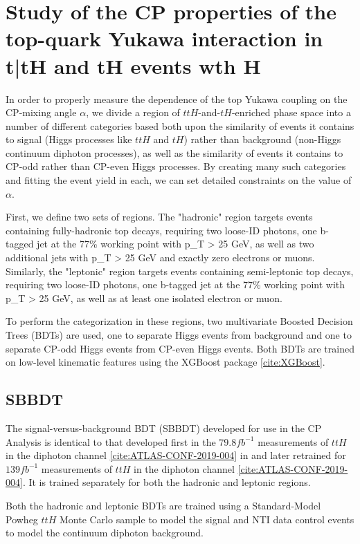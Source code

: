 \section{Study of the CP properties of the top-quark Yukawa interaction in t\bar{t}H and tH events wth H \rightarrow \gamma \gamma} \label{sec:ttHCPCategorization}

In order to properly measure the dependence of the top Yukawa coupling on the CP-mixing angle $\alpha$, we divide a region of $ttH$-and-$tH$-enriched phase space into a number of different categories based both upon the similarity of events it contains to signal (Higgs processes like $ttH$ and $tH$) rather than background (non-Higgs continuum diphoton processes), as well as the similarity of events it contains to CP-odd rather than CP-even Higgs processes. By creating many such categories and fitting the event yield in each, we can set detailed constraints on the value of $\alpha$.

First, we define two sets of regions. The "hadronic" region targets events containing fully-hadronic top decays, requiring two loose-ID photons, one b-tagged jet at the 77\% working point with p_{T} > 25 GeV, as well as two additional jets with p_{T} > 25 GeV and exactly zero electrons or muons. Similarly, the "leptonic" region targets events containing semi-leptonic top decays, requiring two loose-ID photons, one b-tagged jet at the 77\% working point with p_{T} > 25 GeV, as well as at least one isolated electron or muon.

To perform the categorization in these regions, two multivariate Boosted Decision Trees (BDTs) are used, one to separate Higgs events from background and one to separate CP-odd Higgs events from CP-even Higgs events. Both BDTs are trained on low-level kinematic features using the XGBoost package \ref{cite:XGBoost}.

\subsection{SBBDT}

The signal-versus-background BDT (SBBDT) developed for use in the CP Analysis is identical to that developed first in the $79.8 fb^{-1}$ measurements of $ttH$ in the diphoton channel \ref{cite:ATLAS-CONF-2019-004} in and later retrained for $139 fb^{-1}$ measurements of $ttH$ in the diphoton channel \ref{cite:ATLAS-CONF-2019-004}. It is trained separately for both the hadronic and leptonic regions.

Both the hadronic and leptonic BDTs are trained using a Standard-Model Powheg $ttH$ Monte Carlo sample to model the signal and NTI data control events to model the continuum diphoton background.

